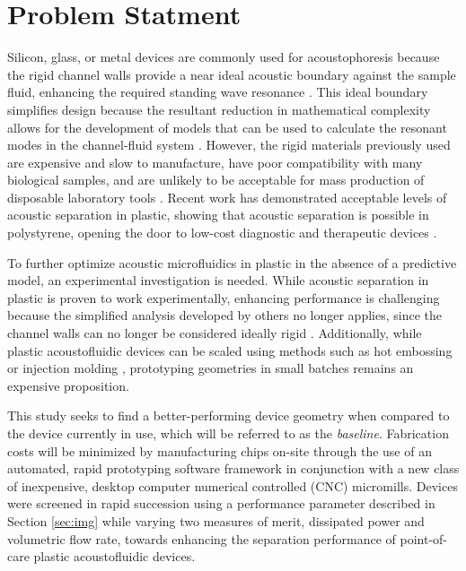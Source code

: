 \section{Problem Statment}
\label{sec:acoust_ps}
Silicon, glass, or metal devices are commonly used for acoustophoresis because the rigid channel walls provide a near ideal acoustic boundary against the sample fluid, enhancing the required standing wave resonance \cite{laurell2007chip}.  This ideal boundary simplifies design because the resultant reduction in mathematical complexity allows for the development of models that can be used to calculate the resonant modes in the channel-fluid system \cite{petersson2007free}.  However, the rigid materials previously used are expensive and slow to manufacture, have poor compatibility with many biological samples, and are unlikely to be acceptable for mass production of disposable laboratory tools \cite{nge2013advances}.  Recent work has demonstrated acceptable levels of acoustic separation in plastic, showing that acoustic separation is possible in polystyrene, opening the door to low-cost diagnostic and therapeutic devices \cite{mueller2013continuous}.

To further optimize acoustic microfluidics in plastic in the absence of a predictive model, an experimental investigation is needed.  While acoustic separation in plastic is proven to work experimentally, enhancing performance is challenging because the simplified analysis developed by others no longer applies, since the channel walls can no longer be considered ideally rigid \cite{barnkob2010measuring}. Additionally, while plastic acoustofluidic devices can be scaled using methods such as hot embossing or injection molding \cite{koerner2005epoxy}, prototyping geometries in small batches remains an expensive proposition. 

This study seeks to find a better-performing device geometry when compared to the device currently in use, which will be referred to as the \textit{baseline}. Fabrication costs will be minimized by manufacturing chips on-site through the use of an automated, rapid prototyping software framework in conjunction with a new class of inexpensive, desktop computer numerical controlled (CNC) micromills. Devices were screened in rapid succession using a performance parameter described in Section \ref{sec:img} while varying two measures of merit, dissipated power and volumetric flow rate, towards enhancing the separation performance of point-of-care plastic acoustofluidic devices.

